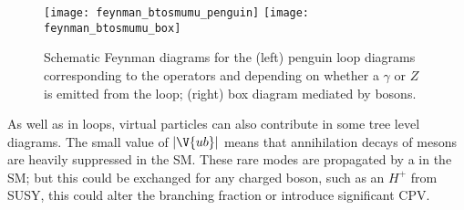 \begin{figure}
  \begin{center}
    \texttt{[image: feynman\_btosmumu\_penguin]}
    \texttt{[image: feynman\_btosmumu\_box]}
    \caption[Schematic Feynman diagrams for loop and box diagrams]
    {\small
      Schematic Feynman diagrams for the
      (left) penguin loop diagrams corresponding to the operators  and  depending on
      whether a $\gamma$ or $Z$ is emitted from the loop;
      (right)  box diagram mediated by \Wp bosons.
    }
    \label{fig:hhh:loops}
  \end{center}
\end{figure}

As well as in loops, virtual particles can also contribute in some tree level diagrams.
The small value of $|\V{ub}|$ means that annihilation decays of \Bp mesons are heavily
suppressed in the SM.
These rare modes are propagated by a \Wp in the SM; but this could be exchanged for any charged
boson, such as an $H^+$ from SUSY, this could alter the branching fraction or
introduce significant CPV.




















